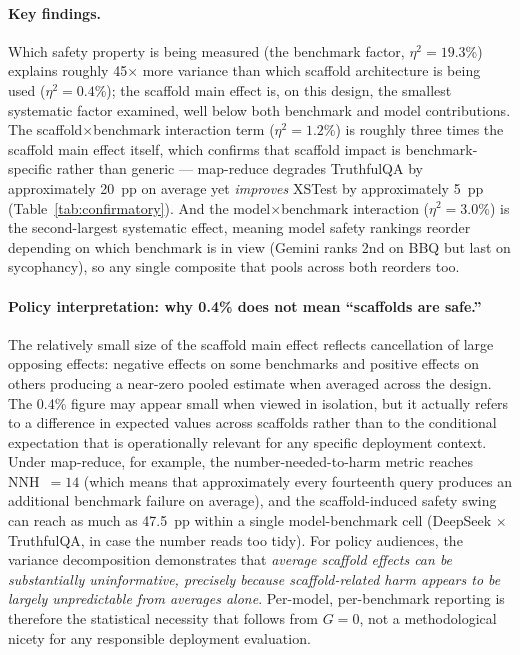 \paragraph{Key findings.}
Which safety property is being measured (the benchmark factor, $\eta^2 = 19.3$\%) explains roughly 45$\times$ more variance than which scaffold architecture is being used ($\eta^2 = 0.4$\%); the scaffold main effect is, on this design, the smallest systematic factor examined, well below both benchmark and model contributions.  The scaffold$\times$benchmark interaction term ($\eta^2 = 1.2$\%) is roughly three times the scaffold main effect itself, which confirms that scaffold impact is benchmark-specific rather than generic --- map-reduce degrades TruthfulQA by approximately 20~pp on average yet \emph{improves} XSTest by approximately 5~pp (Table~\ref{tab:confirmatory}).  And the model$\times$benchmark interaction ($\eta^2 = 3.0$\%) is the second-largest systematic effect, meaning model safety rankings reorder depending on which benchmark is in view (Gemini ranks 2nd on BBQ but last on sycophancy), so any single composite that pools across both reorders too.

\paragraph{Policy interpretation: why 0.4\% does not mean ``scaffolds are safe.''}
The relatively small size of the scaffold main effect reflects cancellation of large opposing effects: negative effects on some benchmarks and positive effects on others producing a near-zero pooled estimate when averaged across the design.  The 0.4\% figure may appear small when viewed in isolation, but it actually refers to a difference in expected values across scaffolds rather than to the conditional expectation that is operationally relevant for any specific deployment context.  Under map-reduce, for example, the number-needed-to-harm metric reaches NNH~$= 14$ (which means that approximately every fourteenth query produces an additional benchmark failure on average), and the scaffold-induced safety swing can reach as much as 47.5~pp within a single model-benchmark cell (DeepSeek $\times$ TruthfulQA, in case the number reads too tidy).  For policy audiences, the variance decomposition demonstrates that \emph{average scaffold effects can be substantially uninformative, precisely because scaffold-related harm appears to be largely unpredictable from averages alone}.  Per-model, per-benchmark reporting is therefore the statistical necessity that follows from $G = 0$, not a methodological nicety for any responsible deployment evaluation.

